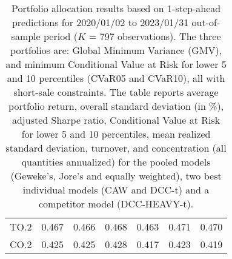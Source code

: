 \begin{table}[ht]
{\begin{tabular}{lccc|ccc}
  TO.2 & 0.467 & 0.466 & 0.468 & 0.463 & 0.471 & 0.470 \\ 
  CO.2 & 0.425 & 0.425 & 0.428 & 0.417 & 0.423 & 0.419 \\ 
   \hline
\end{tabular}
}
\caption{Portfolio allocation results based on 1-step-ahead
              predictions for 2020/01/02 to 2023/01/31 out-of-sample period ($K$ = 797 observations).
              The three portfolios are:
             Global Minimum Variance (GMV), and minimum Conditional Value at Risk
             for lower 5 and 10 percentiles (CVaR05 and CVaR10), all with short-sale constraints.
             The table reports average portfolio return,
             overall standard deviation (in \%),
             adjusted Sharpe ratio, Conditional Value at Risk
             for lower 5 and 10 percentiles,
             mean realized standard deviation,
             turnover, and concentration (all quantities annualized) for the
             pooled models (Geweke's, Jore's and
             equally weighted),
              two best individual models (CAW  and DCC-t) and a competitor model (DCC-HEAVY-t).} 
\label{table:gmvfull_FX_new}
\end{table}


